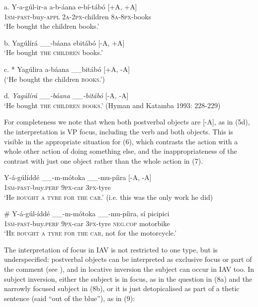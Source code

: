 \documentclass[output=paper]{langsci/langscibook}
\begin{document}
\ea
\gll a.  Y-a-gúl-ir-a      a-b-áana    e-bí-tábó  \textup{[+A, +A]}\\
       1\textsc{sm}-\textsc{past}-buy-\textsc{appl }   \textsc{2a-2px}-children  \textsc{8a-8px}-books\\
\glt   ‘He bought the children books.’             
\z

\ea
  b.  Yagúlírá \_\_-báana ebitábó            \textup{[-A, +A]} \\
\glt   ‘He bought \textsc{the children} books.’           
\z

\ea
  c.  * Yagúlira a-báana \_\_bitábó            \textup{[+A, -A]}\\
\glt   (‘He bought the children \textsc{books}.’)           
\z

\ea
\glt d.  \textit{Yagúlírá \_\_-báana \_\_-bitábó}            [-A, -A]\\
  ‘He bought \textsc{the children books}.’ (Hyman and Katamba 1993: 228-229)
\z

For completeness we note that when both postverbal objects are [-A], as in (5d), the interpretation is VP focus, including the verb and both objects. This is visible in the appropriate situation for (6), which contrasts the action with a whole other action of doing something else, and the inappropriateness of the contrast with just one object rather than the whole action in (7).

\ea
\gll Y-á-gúlíddé    \_\_-m-mótoka    \_\_-mu-píira      \textup{[-A, -A]}\\
 \textsc{1sm-past}-buy.\textsc{perf}       \textsc{9px}-car              \textsc{3px}-tyre\\
\glt‘He \textsc{bought a tyre for the car}.’ (i.e. this was the only work he did) 
\z

\ea
\gll \# Y-á-gúl-íddé      \_\_-m-mótoka    \_\_-mu-píira,  sí    picipici\\
     \textsc{1sm-past}-buy.\textsc{perf   }    \textsc{9px}-car       \textsc{3px}-tyre   \textsc{neg}.\textsc{cop}  motorbike\\
\glt   ‘\textsc{He bought a tyre for the car}, not for the motorcycle.’
\z

The interpretation of focus in IAV is not restricted to one type, but is underspecified: postverbal objects can be interpreted as exclusive focus or part of the comment (see ), and in locative inversion the subject can occur in IAV too. In subject inversion, either the subject is in focus, as in the question in (8a) and the narrowly focused subject in (8b), or it is just detopicalised as part of a thetic sentence (said “out of the blue”), as in (9):
\end{document}
